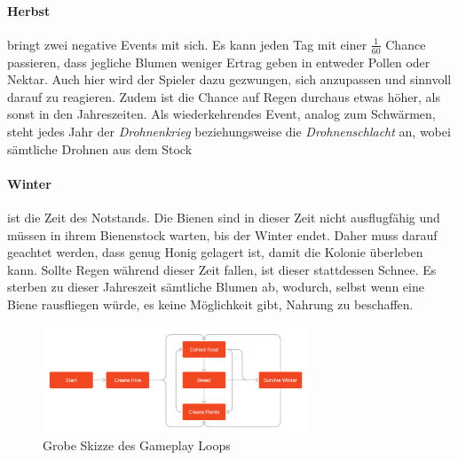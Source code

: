 \paragraph{Herbst} bringt zwei negative Events mit sich. Es kann jeden Tag mit einer $\frac{1}{60}$ Chance passieren, dass jegliche Blumen weniger Ertrag geben in entweder Pollen oder Nektar. Auch hier wird der Spieler dazu gezwungen, sich anzupassen und sinnvoll darauf zu reagieren. Zudem ist die Chance auf Regen durchaus etwas höher, als sonst in den Jahreszeiten. Als wiederkehrendes Event, analog zum Schwärmen, steht jedes Jahr der \textit{Drohnenkrieg} beziehungsweise die \textit{Drohnenschlacht} an, wobei sämtliche Drohnen aus dem Stock 

\paragraph{Winter} ist die Zeit des Notstands. Die Bienen sind in dieser Zeit nicht ausflugfähig und müssen in ihrem Bienenstock warten, bis der Winter endet. Daher muss darauf geachtet werden, dass genug Honig gelagert ist, damit die Kolonie überleben kann. Sollte Regen während dieser Zeit fallen, ist dieser stattdessen Schnee. Es sterben zu dieser Jahreszeit sämtliche Blumen ab, wodurch, selbst wenn eine Biene rausfliegen würde, es keine Möglichkeit gibt, Nahrung zu beschaffen.

\begin{figure}
    \begin{center}
        \includegraphics[width=300px]{0.bilder/gameplayloop.PNG}
    \end{center}
    \caption{Grobe Skizze des Gameplay Loops} \label{image:gameplayloop}
\end{figure}


